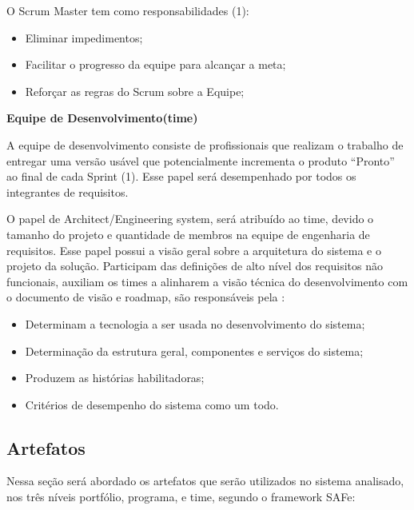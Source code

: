 \begin{description}
O Scrum Master tem como responsabilidades (1):
\begin{itemize}
    \item Eliminar impedimentos;
    \item Facilitar o progresso da equipe para alcançar a meta;
    \item Reforçar as regras do Scrum sobre a Equipe;
\end{itemize}

\item \textbf{Equipe de Desenvolvimento(time)}

A equipe de desenvolvimento consiste de profissionais que realizam o trabalho de entregar uma versão usável que potencialmente incrementa o produto “Pronto” ao final de cada Sprint (1). Esse papel será desempenhado por todos os integrantes de requisitos.

O papel de Architect/Engineering system, será atribuído ao time, devido o tamanho do projeto e quantidade de membros na equipe de engenharia de requisitos. Esse papel possui a visão geral sobre a arquitetura do sistema e o projeto da solução. Participam das definições de alto nível dos requisitos não funcionais, auxiliam os times a alinharem a visão técnica do desenvolvimento com o documento de visão e roadmap, são responsáveis pela \cite{safe}:
\begin{itemize}
    \item Determinam a tecnologia a ser usada no desenvolvimento do sistema;
    \item Determinação da estrutura geral, componentes e serviços do sistema;
    \item Produzem as histórias habilitadoras;
    \item Critérios de desempenho do sistema como um todo.
\end{itemize}
\end{description}
\subsection{Artefatos}

Nessa seção será abordado os artefatos que serão utilizados no sistema analisado, nos três níveis portfólio, programa, e time, segundo o framework SAFe:

